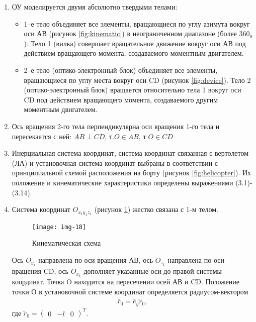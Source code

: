 \begin{enumerate}
	\item ОУ моделируется двумя абсолютно твердыми телами:
	\begin{itemize}
		\item 1–е тело объединяет все элементы, вращающиеся по углу азимута вокруг оси АВ (рисунок \ref{fig:kinematic}) в неограниченном диапазоне (более $360_0$). Тело 1 (вилка) совершает вращательное движение вокруг оси АВ под действием вращающего момента, создаваемого моментным двигателем.
		\item 2–е тело (оптико-электронный блок) объединяет все элементы, вращающиеся по углу места вокруг оси CD (рисунок \ref{fig:device}). Тело 2 (оптико-электронный блок) вращается относительно тела 1 вокруг оси CD под действием вращающего момента, создаваемого другим моментным двигателем.
	\end{itemize}
	\item Ось вращения 2-го тела перпендикулярна оси вращения 1-го тела и пересекается с ней: $AB\perp CD$, т.$O \in AB$, т.$O \in CD$
	\item Инерциальная система координат, система координат связанная с вертолетом (ЛА) и установочная система координат выбраны в соответствии с принципиальной схемой расположения на борту (рисунок \ref{fig:helicopter}). Их положение и кинематические характеристики определены выражениями (3.1)-(3.14).
	\item Система координат $O_{x_1y_1z_1}$ (рисунок \ref{fig:coord/3.4}) жестко связана с 1-м телом. 
	\begin{figure}[ht]
		\centering
		\texttt{[image: img-18]} 
		\caption{Кинематическая схема}
		\label{fig:coord/3.4}
	\end{figure}

	Ось $O_{y_1}$ направлена по оси вращения АВ, ось $O_{z_1}$ направлена по оси вращения CD, ось $O_{x_1}$ дополняет указанные оси до правой системы координат. Точка O находится на пересечении осей АВ и CD. Положение точки О в установочной системе координат определяется радиусом-вектором
	\begin{equation}
	\label{eq:p3:1}
	\begin{alignedat}{2}
	\bar{r}_0 = \bar{e}_y\tilde{r}_0,
	\end{alignedat}
	\end{equation}
	где $\tilde{r}_0 = \left( \begin{matrix}	0 & -l & 0 \end{matrix} \right)^T$.
	

\end{enumerate}
